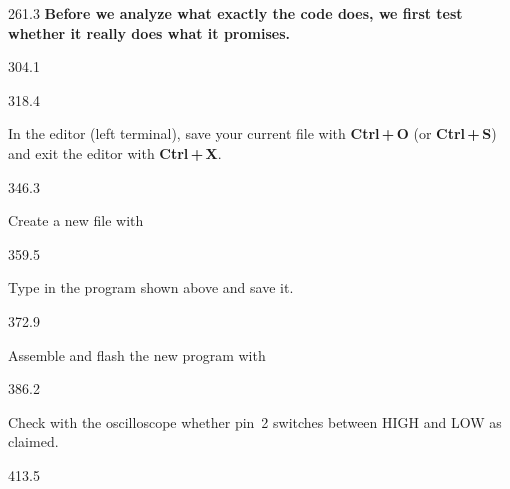 \documentclass{aslab}
\begin{document}
\begin{region}[pitch=14.3]{261.3}
\textbf{Before we analyze what exactly the code does, we first test whether
it really does what it promises.}
\end{region}

\begin{region}{304.1}
\end{region}

\begin{region}[pitch=14.3]{318.4}
\begin{alphatasks}
\item In the editor  (left terminal), save your current file with
  \textbf{Ctrl\,+\,O} (or \textbf{Ctrl\,+\,S}) and exit the editor with
  \textbf{Ctrl\,+\,X}.
\end{alphatasks}
\end{region}

\begin{region}{346.3}
\begin{alphatasks}[start=2]
\item Create a new file with 
\end{alphatasks}
\end{region}

\begin{region}{359.5}
\begin{alphatasks}[start=3]
\item Type in the program shown above and save it.
\end{alphatasks}
\end{region}

\begin{region}{372.9}
\begin{alphatasks}[start=4]
\item Assemble and flash the new program with
\end{alphatasks}
\end{region}

\begin{region}{386.2}
\begin{alphatasks}[start=5]
\item Check with the oscilloscope whether pin~2 switches between HIGH and
  LOW as claimed.
\end{alphatasks}
\end{region}

\begin{region}{413.5}
\end{region}
\end{document}
